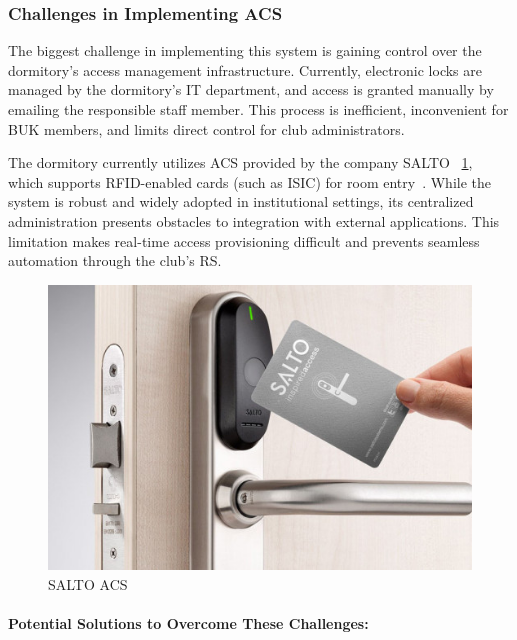 \subsubsection{Challenges in Implementing ACS}

The biggest challenge in implementing this system is gaining control over the dormitory’s access management infrastructure. Currently, electronic locks are managed by the dormitory’s IT department, and access is granted manually by emailing the responsible staff member. This process is inefficient, inconvenient for BUK members, and limits direct control for club administrators.

The dormitory currently utilizes ACS provided by the company SALTO ~\ref{fig:salto}, which supports RFID-enabled cards (such as ISIC) for room entry~\cite{SALTO}. While the system is robust and widely adopted in institutional settings, its centralized administration presents obstacles to integration with external applications. This limitation makes real-time access provisioning difficult and prevents seamless automation through the club’s RS.

\begin{figure}[!htbp]
  \centering
  \includegraphics[width=\linewidth]{images/salto}
  \caption{SALTO ACS~\cite{SALTO}}
  \label{fig:salto}
\end{figure}

\paragraph{Potential Solutions to Overcome These Challenges:}

